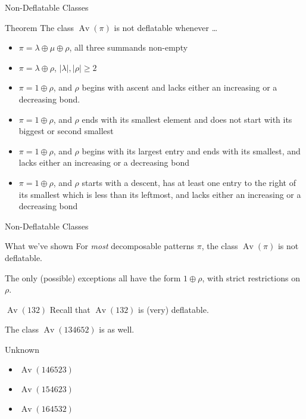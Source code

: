 \documentclass[xcolor=table,dvipsnames]{beamer}
\DeclareMathOperator{\Av}{Av}
\begin{document}
\begin{frame}{Non-Deflatable Classes}
  \begin{block}{Theorem}
    The class $\Av(\pi)$ is not deflatable whenever \dots
    \begin{itemize}
    \pause
    \item $\pi = \lambda \oplus \mu \oplus \rho$, all three summands non-empty
    \pause
    \item $\pi = \lambda \oplus \rho$, $|\lambda|, |\rho| \geq 2$
    \pause
    \item $\pi = 1 \oplus \rho$, and $\rho$ begins with ascent and lacks either 
    an increasing or a decreasing bond. 
    \pause
    \item $\pi = 1 \oplus \rho$, and $\rho$ ends with its smallest element and does 
    not start with its biggest or second smallest
    \pause
    \item $\pi = 1 \oplus \rho$, and $\rho$ begins with its largest entry and 
    ends with its smallest, and lacks either an increasing or a decreasing bond
    \pause
    \item $\pi = 1 \oplus \rho$, and $\rho$ starts with a descent, has at least 
    one entry to the right of its smallest which is less than its leftmost, and 
    lacks either an increasing or a decreasing bond
    \end{itemize}
  \end{block}
\end{frame}

\begin{frame}{Non-Deflatable Classes}
  \begin{block}{What we've shown}
    For \emph{most} decomposable patterns $\pi$, the class $\Av(\pi)$ is not 
    deflatable. 

    The only (possible) exceptions all have the form $1 \oplus \rho$, with 
    strict restrictions on $\rho$. 
  \end{block}

  \pause

  \begin{block}{$\Av(132)$}
    Recall that $\Av(132)$ is (very) deflatable.
    \pause

    The class $\Av(134652)$ is as well.
  \end{block}

  \pause
  
  \begin{block}{Unknown}
    \begin{itemize}
    \item $\Av(146523)$
    \item $\Av(154623)$
    \item $\Av(164532)$
    \end{itemize}
  \end{block}
\end{frame}
\end{document}
